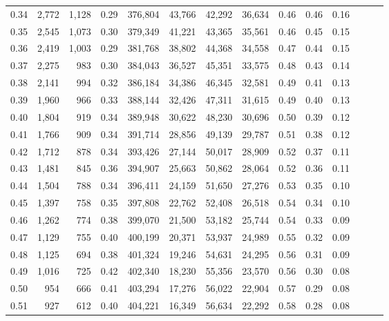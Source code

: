 \begin{tabular}{rrrrrrrrrrrrrr}
0.34 &   2,772 &  1,128 &  0.29 &  376,804 &   43,766 &  42,292 &  36,634 &  0.46 &  0.46 &      0.16 \\
0.35 &   2,545 &  1,073 &  0.30 &  379,349 &   41,221 &  43,365 &  35,561 &  0.46 &  0.45 &      0.15 \\
0.36 &   2,419 &  1,003 &  0.29 &  381,768 &   38,802 &  44,368 &  34,558 &  0.47 &  0.44 &      0.15 \\
0.37 &   2,275 &    983 &  0.30 &  384,043 &   36,527 &  45,351 &  33,575 &  0.48 &  0.43 &      0.14 \\
0.38 &   2,141 &    994 &  0.32 &  386,184 &   34,386 &  46,345 &  32,581 &  0.49 &  0.41 &      0.13 \\
0.39 &   1,960 &    966 &  0.33 &  388,144 &   32,426 &  47,311 &  31,615 &  0.49 &  0.40 &      0.13 \\
0.40 &   1,804 &    919 &  0.34 &  389,948 &   30,622 &  48,230 &  30,696 &  0.50 &  0.39 &      0.12 \\
0.41 &   1,766 &    909 &  0.34 &  391,714 &   28,856 &  49,139 &  29,787 &  0.51 &  0.38 &      0.12 \\
0.42 &   1,712 &    878 &  0.34 &  393,426 &   27,144 &  50,017 &  28,909 &  0.52 &  0.37 &      0.11 \\
0.43 &   1,481 &    845 &  0.36 &  394,907 &   25,663 &  50,862 &  28,064 &  0.52 &  0.36 &      0.11 \\
0.44 &   1,504 &    788 &  0.34 &  396,411 &   24,159 &  51,650 &  27,276 &  0.53 &  0.35 &      0.10 \\
0.45 &   1,397 &    758 &  0.35 &  397,808 &   22,762 &  52,408 &  26,518 &  0.54 &  0.34 &      0.10 \\
0.46 &   1,262 &    774 &  0.38 &  399,070 &   21,500 &  53,182 &  25,744 &  0.54 &  0.33 &      0.09 \\
0.47 &   1,129 &    755 &  0.40 &  400,199 &   20,371 &  53,937 &  24,989 &  0.55 &  0.32 &      0.09 \\
0.48 &   1,125 &    694 &  0.38 &  401,324 &   19,246 &  54,631 &  24,295 &  0.56 &  0.31 &      0.09 \\
0.49 &   1,016 &    725 &  0.42 &  402,340 &   18,230 &  55,356 &  23,570 &  0.56 &  0.30 &      0.08 \\
0.50 &     954 &    666 &  0.41 &  403,294 &   17,276 &  56,022 &  22,904 &  0.57 &  0.29 &      0.08 \\
0.51 &     927 &    612 &  0.40 &  404,221 &   16,349 &  56,634 &  22,292 &  0.58 &  0.28 &      0.08 \\

\end{tabular}
